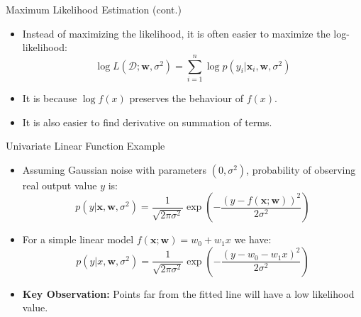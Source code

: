 \documentclass[serif, aspectratio=169]{beamer}
\begin{document}
    \begin{frame}{Maximum Likelihood Estimation (cont.)}
        \begin{itemize}
            \item Instead of maximizing the likelihood, it is often easier to maximize the log-likelihood:
            \[
                \log L(\mathcal{D}; \mathbf{w}, \sigma^2) = \sum_{i=1}^n \log  p(y_i | \mathbf{x}_i, \mathbf{w}, \sigma^2)
            \]
            \item It is because \( \log f(x) \) preserves the behaviour of \( f(x) \).
            \item It is also easier to find derivative on summation of terms.
        \end{itemize}
    \end{frame}

    \begin{frame}{Univariate Linear Function Example}
        \begin{itemize}
            \item Assuming Gaussian noise with parameters \( (0, \sigma^2) \), probability of observing real output value \( y \) is:
            \[
                p(y | \mathbf{x}, \mathbf{w}, \sigma^2) = \frac{1}{\sqrt{2\pi \sigma^2}} \exp \left( - \frac{(y - f(\mathbf{x}; \mathbf{w}))^2}{2\sigma^2} \right)
            \]

            \item For a simple linear model \( f(\mathbf{x}; \mathbf{w}) = w_0 + w_1 x \) we have:
            \[
                p(y | x, \mathbf{w}, \sigma^2) = \frac{1}{\sqrt{2\pi \sigma^2}} \exp \left( - \frac{(y - w_0 - w_1 x)^2}{2\sigma^2} \right)
            \]
            \item \textbf{Key Observation:} Points far from the fitted line will have a low likelihood value.
        \end{itemize}
    \end{frame}
\end{document}
